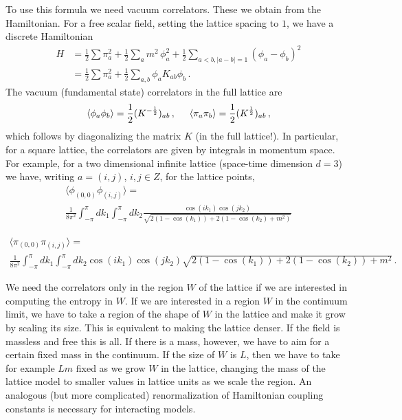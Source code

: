\documentclass[12pt]{article}
\numberwithin{equation}{section}
\begin{document}
To use this formula we need vacuum correlators. These we obtain from the Hamiltonian. For a free scalar field, setting the lattice spacing to $1$, we have a discrete Hamiltonian
\begin{align}
H &=\frac{1}{2}\sum \pi _{a}^{2}+\frac{1}{2}\sum_{a}m^2\, \phi_a^2+\frac{1}{2}\sum_{a<b, |a-b|=1}    (\phi_a -\phi_{b})^2 \nonumber\\
& =\frac{1}{2}\sum \pi _{a}^{2}+\frac{1}{2}\sum_{a,b}\phi _{a}K_{ab}\phi
_{b}\,.
\end{align}
The vacuum (fundamental state) correlators in the full lattice are 
\begin{equation}
\left\langle \phi _{a}\phi _{b}\right\rangle =\frac{1}{2}(K^{-
\frac{1}{2}})_{ab}\,, \hspace{.5cm}
\left\langle \pi _{a}\pi _{b}\right\rangle =\frac{1}{2}(K^{\frac{1
}{2}})_{ab}\,, \label{p}
\end{equation}
which follows by diagonalizing the matrix $K$ (in the full lattice!). In particular, for a square lattice, the correlators are given by integrals in momentum space. For example, for a two dimensional infinite lattice (space-time dimension $d=3$) we have, writing $a=(i,j)$, $i,j \in Z$, for the lattice points,  
\begin{multline}
\langle \phi_{(0,0)}\phi_{(i,j)}\rangle = \\ 
\frac{1}{8\pi^2}\int_{-\pi}^{\pi}dk_1 \int_{-\pi}^{\pi}dk_2\frac{\cos(i k_1)\cos(j k_2)}{\sqrt{2
(1-\cos(k_1))+2
(1-\cos(k_2)+m^2)}}
\end{multline}

\begin{multline}
\langle \pi_{(0,0)}\pi_{(i,j)}\rangle =\\ 
\frac{1}{8\pi^2}\int_{-\pi}^{\pi} dk_1\int_{-\pi}^{\pi}dk_2 \cos(i k_1)\cos(j k_2){\sqrt{2
(1-\cos(k_1))+2
(1-\cos(k_2))+m^2}}\,.
\end{multline}


We need the correlators only in the region $W$ of the lattice if we are interested in computing the entropy in $W$. If we are interested in a region $W$ in the continuum limit, we have to take a region of the shape of $W$ in the lattice and make it grow by scaling its size. This is equivalent to making the lattice denser. If the field is massless and free this is all. If there is a mass, however, we have to aim for a certain fixed mass in the continuum. If the size of $W$ is $L$, then we have to take for example $L m$ fixed as we grow $W$ in the lattice, changing the mass of the lattice model to smaller values in lattice units as we scale the region. An analogous (but more complicated) renormalization of Hamiltonian coupling constants is necessary for interacting models.    
\end{document}

